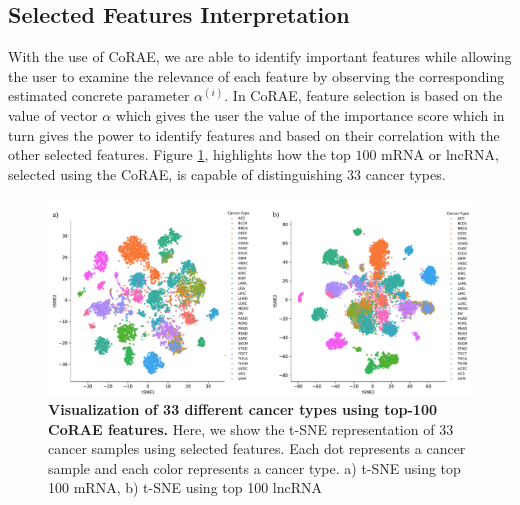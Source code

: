\documentclass{bioinfo}
\begin{document}
\subsection{Selected Features Interpretation} \label{inter}
With the use of CoRAE, we are able to identify important features while allowing the user to examine the relevance of each feature by observing the corresponding estimated concrete parameter $\alpha^{(i)}$.
In CoRAE, feature selection is based on the value of vector $\alpha$ which gives the user the value of the importance score which in turn gives the power to identify features and based on their correlation with the other selected features. 
Figure \ref{fig:tsne}, highlights how the top $100$ mRNA or lncRNA, selected using the CoRAE, is capable of distinguishing $33$ cancer types. 
\begin{figure}[hbt]
  \centering
  \includegraphics[scale=0.45]{fig/tSNE.pdf}
    \caption{\textbf{Visualization of 33 different cancer types using top-100 CoRAE features.} Here, we show the t-SNE representation of 33 cancer samples using selected features. Each dot represents a cancer sample and each color represents a cancer type. a) t-SNE using top 100 mRNA, b) t-SNE using top 100 lncRNA}
    \label{fig:tsne}
\end{figure}
\end{document}
